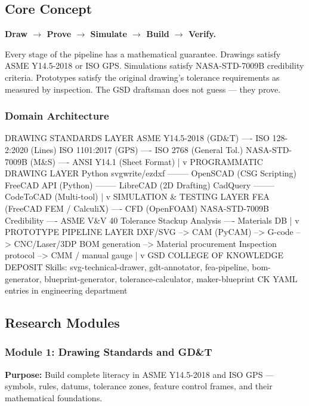 \documentclass[11pt,letterpaper]{article}
\begin{document}
\subsection{Core Concept}

\textbf{Draw $\rightarrow$ Prove $\rightarrow$ Simulate $\rightarrow$ Build $\rightarrow$ Verify.}

Every stage of the pipeline has a mathematical guarantee. Drawings satisfy ASME Y14.5-2018 or ISO GPS. Simulations satisfy NASA-STD-7009B credibility criteria. Prototypes satisfy the original drawing's tolerance requirements as measured by inspection. The GSD draftsman does not guess --- they prove.

\subsubsection{Domain Architecture}

\begin{asciibox}
DRAWING STANDARDS LAYER
  ASME Y14.5-2018 (GD\&T) ---- ISO 128-2:2020 (Lines)
  ISO 1101:2017 (GPS)     ---- ISO 2768 (General Tol.)
  NASA-STD-7009B (M\&S)    ---- ANSI Y14.1 (Sheet Format)
              |
              v
PROGRAMMATIC DRAWING LAYER
  Python svgwrite/ezdxf -------- OpenSCAD (CSG Scripting)
  FreeCAD API (Python)  -------- LibreCAD (2D Drafting)
  CadQuery              -------- CodeToCAD (Multi-tool)
              |
              v
SIMULATION \& TESTING LAYER
  FEA (FreeCAD FEM / CalculiX) ---- CFD (OpenFOAM)
  NASA-STD-7009B Credibility   ---- ASME V\&V 40
  Tolerance Stackup Analysis   ---- Materials DB
              |
              v
PROTOTYPE PIPELINE LAYER
  DXF/SVG --> CAM (PyCAM) --> G-code --> CNC/Laser/3DP
  BOM generation --> Material procurement
  Inspection protocol --> CMM / manual gauge
              |
              v
GSD COLLEGE OF KNOWLEDGE DEPOSIT
  Skills: svg-technical-drawer, gdt-annotator,
          fea-pipeline, bom-generator, blueprint-generator,
          tolerance-calculator, maker-blueprint
  CK YAML entries in engineering department
\end{asciibox}

\subsection{Research Modules}

\subsubsection{Module 1: Drawing Standards and GD\&T}
\textbf{Purpose:} Build complete literacy in ASME Y14.5-2018 and ISO GPS --- symbols, rules, datums, tolerance zones, feature control frames, and their mathematical foundations.
\end{document}
